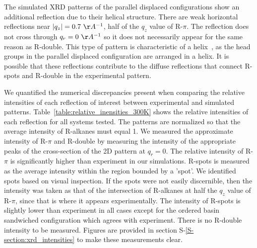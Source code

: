 \documentclass[journal=jpcbfk,manuscript=article]{achemso}
\begin{document}
  The simulated XRD patterns of the parallel displaced configurations show an additional
  reflection due to their helical structure. There are weak horizontal reflections near $|q_z|= 
  0.7~\AA^{-1}$, half of the $q_z$ value of R-$\pi$. The reflection does not cross through
  $q_r = 0~\AA^{-1}$ so it does not necessarily appear for the same reason as R-double. 
  This type of pattern is characteristic of a helix~\cite{watson_structure_1953}, as the 
  head groups in the parallel displaced configuration are arranged in a helix.
  It is possible that these reflections contribute to the diffuse reflections that connect
  R-spots and R-double in the experimental pattern.

  We quantified the numerical discrepancies present when comparing the relative intensities
  of each reflection of interest between experimental and simulated patterns. 
  Table~\ref{table:relative_inensities_300K} shows the relative intensities of each reflection for 
  all systems tested. The patterns are normalized so that the average intensity of R-alkanes 
  must equal 1. We measured the approximate intensity of R-$\pi$ and R-double by measuring the
  intensity of the appropriate peaks of the cross-section of the 2D pattern at $q_r=0$. The 
  relative intensity of R-$\pi$ is significantly higher than experiment in our simulations. 
  R-spots is measured as the average intensity within the region bounded by a 'spot'. We 
  identified spots based on visual inspection. If the spots were not easily discernible, then the 
  intensity was taken as that of the intersection of R-alkanes at half the $q_z$ value of
  R-$\pi$, since that is where it appears experimentally. The intensity of R-spots is slightly
  lower than experiment in all cases except for the ordered basin sandwiched configuration which 
  agrees with experiment. There is no R-double intensity to be measured. Figures
  are provided in section S-\ref{S-section:xrd_intensities} to make these measurements clear.
\end{document}
